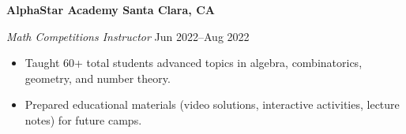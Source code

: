 \textbf{AlphaStar Academy \hfill Santa Clara, CA}\par
\textit{Math Competitions Instructor} \hfill Jun 2022--Aug 2022

\begin{itemize}
	\item Taught 60+ total students advanced topics in algebra, combinatorics, geometry, and number theory.
	\item Prepared educational materials (video solutions, interactive activities, lecture notes) for future camps.
\end{itemize}\par